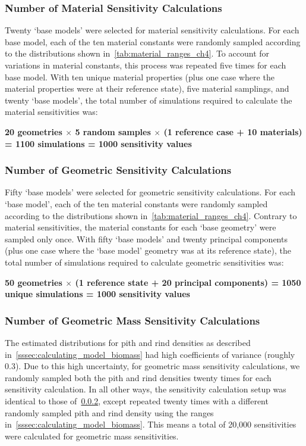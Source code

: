 \subsubsection{Number of Material Sensitivity Calculations}
\label{sssec:number_of_material_sensitivity_calculations}
Twenty ‘base models’ were selected for material sensitivity calculations. For each base model, each of the ten material constants were randomly sampled according to the distributions shown in~\cref{tab:material_ranges_ch4}. To account for variations in material constants, this process was repeated five times for each base model. With ten unique material properties (plus one case where the material properties were at their reference state), five material samplings, and twenty ‘base models’, the total number of simulations required to calculate the material sensitivities was:

\hfill \break
\textbf{20 geometries  ${\times}$  5 random samples  ${\times}$  (1 reference case + 10 materials) \newline
= 1100 simulations = 1000 sensitivity values}
\hfill \break

\subsubsection{Number of Geometric Sensitivity Calculations}
\label{sssec:number_of_geometric_sensitivity_calculations}
Fifty ‘base models’ were selected for geometric sensitivity calculations. For each ‘base model’, each of the ten material constants were randomly sampled according to the distributions shown in~\cref{tab:material_ranges_ch4}. Contrary to material sensitivities, the material constants for each ‘base geometry’ were sampled only once. With fifty ‘base models’ and twenty principal components (plus one case where the ‘base model’ geometry was at its reference state), the total number of simulations required to calculate geometric sensitivities was:

\hfill \break
\textbf{50 geometries ${\times}$ (1 reference state + 20 principal components) \newline
= 1050 unique simulations = 1000 sensitivity values}
\hfill \break

\subsubsection{Number of Geometric Mass Sensitivity Calculations}
\label{sssec:number_of_geometric_mass_sensitivity_calculations}
The estimated distributions for pith and rind densities as described in~\cref{sssec:calculating_model_biomass} had high coefficients of variance (roughly 0.3). Due to this high uncertainty, for geometric mass sensitivity calculations, we randomly sampled both the pith and rind densities twenty times for each sensitivity calculation. In all other ways, the sensitivity calculation setup was identical to those of~\cref{sssec:number_of_geometric_sensitivity_calculations}, except repeated twenty times with a different randomly sampled pith and rind density using the ranges in~\cref{sssec:calculating_model_biomass}. This means a total of 20,000 sensitivities were calculated for geometric mass sensitivities.

